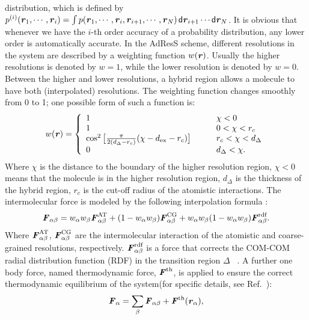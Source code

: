 \documentclass[aps,a4paper,reprint,onecolumn]{revtex4}
\newcommand{\vect}[1]{\textbf{\textit{#1}}}
\newcommand{\dd}[1]{\textsf{#1}}
\newcommand{\AT}{{\textrm{{AT}}}}
\newcommand{\CG}{{\textrm{CG}}}
\newcommand{\HY}{{\Delta}}
\newcommand{\rdf}{{\textrm{rdf}}}
\begin{document}
  distribution, which is defined by
  $p^{(i)}(\vect r_1, \cdots, \vect r_i)
  = \int p(\vect r_1, \cdots, \vect r_i, \vect r_{i+1}, \cdots, \vect r_N)\,
  \dd d \vect r_{i+1}\cdots\dd d \vect r_N$.
  It is obvious that
  whenever we have the $i$-th order accuracy of a probability distribution,
  any lower  order is automatically accurate.
In the AdResS scheme,
different resolutions in the system are described by a weighting
function $w(\vect r)$. Usually the higher resolutions is
denoted by $w = 1$, while the lower resolution is denoted by $w = 0$.
Between the higher and lower resolutions, a hybrid region allows a 
molecule to have both (interpolated) resolutions. The weighting function changes smoothly
from 0 to 1; one possible form of such a function is:
\begin{align}\label{eqn:new-w}
  w(\vect r) =
  \left\{
    \begin{array}{lcl}
      1 &\quad& \chi < 0\\
      1  && 0 < \chi < r_c\\
      \cos^2\big[\frac{\pi}{2(d_{\HY} - r_c)} (\chi - d_{\textrm{ex}} - r_c)\big] && r_c < \chi < d_{\HY} \\
      0 &&  d_{\HY}  < \chi.
    \end{array}
  \right.
\end{align}
Where $\chi$ is the distance to the boundary of the higher resolution
region, $\chi < 0$ means that the molecule is in the higher resolution
region, $d_{\HY}$ is the thickness of the hybrid region, $r_c$ is the
cut-off radius of the atomistic interactions.  The intermolecular force is modeled by the following
interpolation formula \cite{rdfcorr}:
\begin{align}
  \vect F_{\alpha\beta} =
  w_\alpha w_\beta\vect F^{\AT}_{\alpha\beta} +
  (1-w_\alpha w_\beta)\vect F^{\CG}_{\alpha\beta} +
  w_\alpha w_\beta (1-w_\alpha w_\beta)\vect F_{\alpha\beta}^{\rdf}.
\label{grf}
\end{align}
Where $ \vect F^{\AT}_{\alpha\beta}$, $ \vect F^{\CG}_{\alpha\beta}$
are the intermolecular interaction of the atomistic and coarse-grained
resolutions, respectively.  $\vect F_{\alpha\beta}^{\rdf}$ is a force that corrects the COM-COM radial distribution function (RDF) in the transition region $\Delta$ ~\cite{rdfcorr}. A further one body force, named thermodynamic force, ${\vect F}^{\textrm{th}}$, is applied to ensure the correct thermodynamic equilibrium of the system(for specific details, see Ref.~\cite{prlgc}):
\begin{equation}
  {\vect F}_{\alpha}=
  \sum_{\beta}{\vect F}_{\alpha\beta}+
  {\vect F}^{\textrm{th}}(\vect r_\alpha),
\label{mody}
\end{equation}
\end{document}
